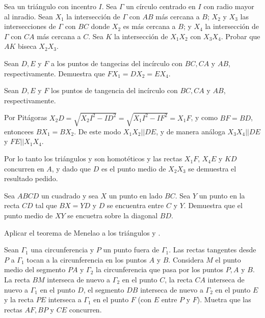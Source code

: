 \begin{section-problem}
    Sea  un triángulo con incentro $I$.
    Sea $\Gamma$ un círculo centrado en $I$ con radio mayor al inradio.
    Sean $X_1$ la intersección de $\Gamma$ con $AB$ más cercana a $B$; $X_2$ y $X_3$ las intersecciones de $\Gamma$ con $BC$ donde $X_2$ es más cercana a $B$; y $X_4$ la intersección de $\Gamma$ con $CA$ más cercana a $C$.
    Sea $K$ la intersección de $X_1 X_2$ con $X_3 X_4$.
    Probar que $AK$ biseca $X_2 X_3$.
\end{section-problem}

\begin{hint}
    Sean $D, E$ y $F$ a los puntos de tangecias del incírculo con $BC, CA$ y $AB$, respectivamente.
    Demuestra que $FX_1 = DX_2 = EX_4$.
\end{hint}

\begin{solution}
    Sean $D, E$ y $F$ los puntos de tangencia del incírculo con $BC, CA$ y $AB$, respectivamente.

    Por Pitágoras $X_2 D = \sqrt {X_2 I^2 - ID^2} = \sqrt {X_1 I^2 - IF^2} = X_1 F$, y como $BF = BD$, entoncees $BX_1 = BX_2$.
    De este modo $X_1 X_2 || DE$, y de manera análoga $X_3 X_4 || DE$ y $FE || X_1 X_4$.

    Por lo tanto los triángulos  y  son homotéticos y las rectas $X_1 F$, $X_4 E$ y $KD$ concurren en $A$, y dado que $D$ es el punto medio de $X_2 X_3$ se demuestra el resultado pedido.
\end{solution}


\begin{section-problem}
    Sea $ABCD$ un cuadrado y sea $X$ un punto en lado $BC$.
    Sea $Y$ un punto en la recta $CD$ tal que $BX = YD$ y $D$ se encuentra entre $C$ y $Y$.
    Demuestra que el punto medio de $XY$ se encuetra sobre la diagonal $BD$.
\end{section-problem}

\begin{hint}
    Aplicar el teorema de Menelao a los triángulos  y .
\end{hint}


\begin{section-problem}
    Sean $\Gamma_1$ una circunferencia y $P$ un punto fuera de $\Gamma_1$.
    Las rectas tangentes desde $P$ a $\Gamma_1$ tocan a la circunferencia en los puntos $A$ y $B$.
    Considera $M$ el punto medio del segmento $PA$ y $\Gamma_2$ la circunferencia que pasa por los puntos $P, A$ y $B$.
    La recta $BM$ interseca de nuevo a $\Gamma_2$ en el punto $C$, la recta $CA$ interseca de nuevo a $\Gamma_1$ en el punto $D$, el segmento $DB$ interseca de nuevo a $\Gamma_2$ en el punto $E$ y la recta $PE$ interseca a $\Gamma_1$ en el punto $F$ (con $E$ entre $P$ y $F$).
    Muetra que las rectas $AF, BP$ y $CE$ concurren.
\end{section-problem}

